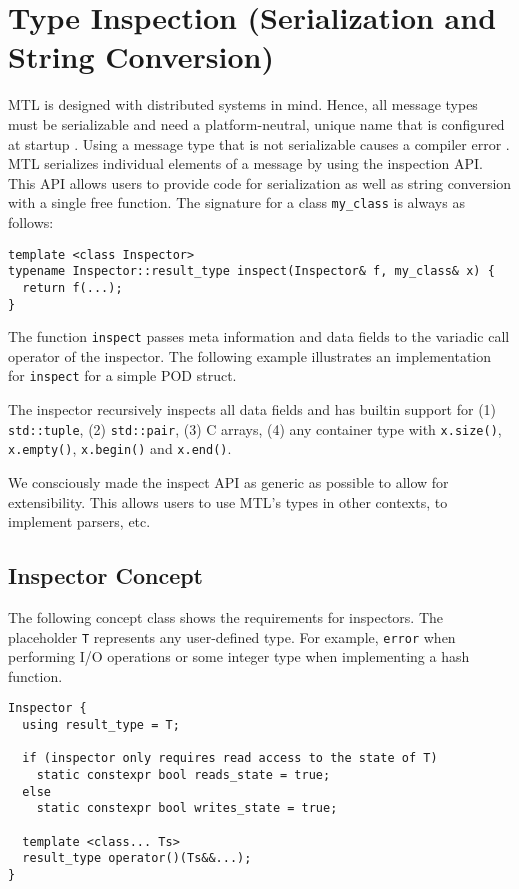 \section{Type Inspection (Serialization and String Conversion)}
\label{type-inspection}

MTL is designed with distributed systems in mind. Hence, all message types
must be serializable and need a platform-neutral, unique name that is
configured at startup . Using a message type that
is not serializable causes a compiler error . MTL
serializes individual elements of a message by using the inspection API. This
API allows users to provide code for serialization as well as string conversion
with a single free function. The signature for a class \lstinline^my_class^ is
always as follows:

\begin{lstlisting}
template <class Inspector>
typename Inspector::result_type inspect(Inspector& f, my_class& x) {
  return f(...);
}
\end{lstlisting}

The function \lstinline^inspect^ passes meta information and data fields to the
variadic call operator of the inspector. The following example illustrates an
implementation for \lstinline^inspect^ for a simple POD struct.


The inspector recursively inspects all data fields and has builtin support for
(1) \lstinline^std::tuple^, (2) \lstinline^std::pair^, (3) C arrays, (4) any
container type with \lstinline^x.size()^, \lstinline^x.empty()^,
\lstinline^x.begin()^ and \lstinline^x.end()^.

We consciously made the inspect API as generic as possible to allow for
extensibility. This allows users to use MTL's types in other contexts, to
implement parsers, etc.

\subsection{Inspector Concept}

The following concept class shows the requirements for inspectors. The
placeholder \lstinline^T^ represents any user-defined type. For example,
\lstinline^error^ when performing I/O operations or some integer type when
implementing a hash function.

\begin{lstlisting}
Inspector {
  using result_type = T;

  if (inspector only requires read access to the state of T)
    static constexpr bool reads_state = true;
  else
    static constexpr bool writes_state = true;

  template <class... Ts>
  result_type operator()(Ts&&...);
}
\end{lstlisting}

